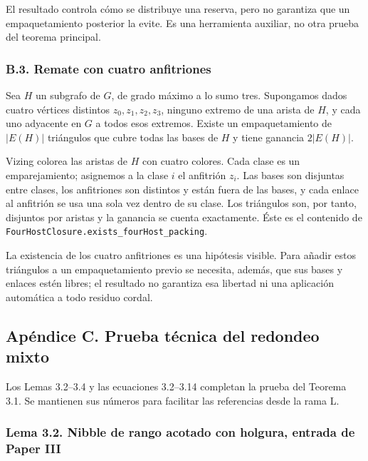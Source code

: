 \documentclass[spanish,11pt,a4paper]{article}
\begin{document}
El resultado controla cómo se distribuye una reserva, pero no garantiza que un empaquetamiento posterior la evite. Es una herramienta auxiliar, no otra prueba del teorema principal.

\subsubsection{B.3. Remate con cuatro anfitriones}\label{b.3.-remate-con-cuatro-anfitriones}

Sea \(H\) un subgrafo de \(G\), de grado máximo a lo sumo tres. Supongamos dados cuatro vértices distintos \(z_0,z_1,z_2,z_3\), ninguno extremo de una arista de \(H\), y cada uno adyacente en \(G\) a todos esos extremos. Existe un empaquetamiento de \(|E(H)|\) triángulos que cubre todas las bases de \(H\) y tiene ganancia \(2|E(H)|\).

Vizing colorea las aristas de \(H\) con cuatro colores. Cada clase es un emparejamiento; asignemos a la clase \(i\) el anfitrión \(z_i\). Las bases son disjuntas entre clases, los anfitriones son distintos y están fuera de las bases, y cada enlace al anfitrión se usa una sola vez dentro de su clase. Los triángulos son, por tanto, disjuntos por aristas y la ganancia se cuenta exactamente. Éste es el contenido de \nolinkurl{FourHostClosure.exists_fourHost_packing}.

La existencia de los cuatro anfitriones es una hipótesis visible. Para añadir estos triángulos a un empaquetamiento previo se necesita, además, que sus bases y enlaces estén libres; el resultado no garantiza esa libertad ni una aplicación automática a todo residuo cordal.

\subsection{Apéndice C. Prueba técnica del redondeo mixto}\label{apuxe9ndice-c.-prueba-tuxe9cnica-del-redondeo-mixto}

Los Lemas 3.2--3.4 y las ecuaciones 3.2--3.14 completan la prueba del Teorema 3.1. Se mantienen sus números para facilitar las referencias desde la rama L.

\subsubsection{Lema 3.2. Nibble de rango acotado con holgura, entrada de Paper III}\label{lema-3.2.-nibble-de-rango-acotado-con-holgura-entrada-de-paper-iii}
\end{document}
